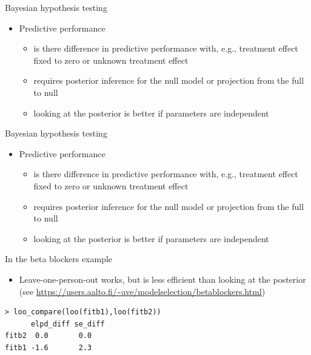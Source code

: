\documentclass[english,t]{beamer}
\begin{document}
\begin{frame}[fragile]{Bayesian hypothesis testing}

  \begin{itemize}
  \item Predictive performance
    \begin{itemize}
    \item is there difference in predictive performance with, e.g.,
      treatment effect fixed to zero or unknown treatment effect
    \item requires posterior inference for the null model or
      projection from the full to null
    \item looking at the posterior is better if parameters are
      independent
    \end{itemize}
  \end{itemize}

\end{frame}

\begin{frame}[fragile]{Bayesian hypothesis testing}

  \begin{itemize}
  \item Predictive performance
    \begin{itemize}
    \item is there difference in predictive performance with, e.g.,
      treatment effect fixed to zero or unknown treatment effect
    \item requires posterior inference for the null model or
      projection from the full to null
    \item looking at the posterior is better if parameters are
      independent
    \end{itemize}
  \end{itemize}

  In the beta blockers example
  \begin{itemize}
  \item Leave-one-person-out works, but is less efficient than looking
    at the posterior (see
    \url{https://users.aalto.fi/~ave/modelselection/betablockers.html})
  \end{itemize}

{\footnotesize
\begin{lstlisting}
> loo_compare(loo(fitb1),loo(fitb2))
      elpd_diff se_diff
fitb2  0.0       0.0   
fitb1 -1.6       2.3   
\end{lstlisting}}

\end{frame}
\end{document}
